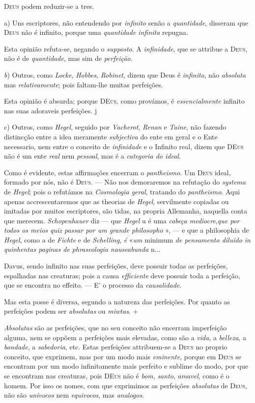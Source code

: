 \textsc{Deus} podem reduzir-se a tres.\par a) Uns escriptores, não entendendo por \emph{infinito} senão a \emph{quantidade}, disseram que \textsc{Deus} não é infinito, porque uma \emph{quantidade infinita} repugna.\par Esta opinião refuta-se, negando o \emph{supposto}. A \emph{infinidade}, que se attribue a \textsc{Deus}, não é de \emph{quantidade}, mas sim de \emph{perfeição}.\par \emph{b}) Outros, como \emph{Locke}, \emph{Hobbes}, \emph{Robinet}, dizem que Deus é \emph{infinito}, não \emph{absoluta} mas \emph{relativamente}; pois faltam-lhe muitas perfeições.\par Esta opinião é absurda; porque \textsc{DEus}, como provámos, é \emph{essencialmente} infinito nas suas adoraveis perfeições. j\par c) Outros, como \emph{Hegel}, seguido por \emph{Vacherot}, \emph{Renan} e \emph{Taine}, não fazendo \textbar{} distincção entre a idea meramente \emph{subjectiva} do ente em geral e o Ente necessario, nem entre o conceito de \emph{infinidade} e o Infinito real, dizem que \textsc{DEus} não é um ente \emph{real} nem \emph{pessoal}, mas é a \emph{categoria do ideal}.\par Como é evidente, estas affirmações encerram o \emph{pantheismo}. Um \textsc{Deus} ideal, formado por nós, não é \textsc{Deus}. --- Não nos demoraremos na refutação do \emph{systema} de \emph{Hegel}; pois o refutámos na \emph{Cosmologia geral}, tratando do \emph{pantheismo}. Aqui apenas accrescentaremos que as theorias de \emph{Hegel}, servilmente copiadas ou imitadas por muitos escriptores, são tidas, na propria Allemanha, naquella conta que merecem. \emph{Schopenhauer} diz --- que \emph{Hegel} u é uma \emph{cabeça mediocre},\emph{que por todos os meios quiz passar por um grande philosopho} », --- e que a philosophia de \emph{Hegel}, como a de \emph{Fichte} e de \emph{Schelling}, \emph{é} «\emph{um} minimum \emph{de pensamento diluido in quinhentas paginas de phraseologia nauseabunda} n...\par Davus, sendo infinito nas suas perfeições, deve possuir todas as perfeições, espalhadas nas creaturas; pois a causa \emph{efficiente} deve possuir toda a perfeição, que se encontra no effeito. --- E' o processo da \emph{causalidade}.\par Mas esta posse é diversa, segundo a natureza das perfeições. Por quanto as perfeições podem ser \emph{absolutas} ou \emph{miwtas}. +\par \emph{Absolutas} são as perfeições, que no seu conceito não encerram imperfeição alguma, nem se oppõem a perfeições mais elevadas, como são a \emph{vida}, a \emph{belleza}, a \emph{bondade}, a \emph{sabedoria}, etc. Estas perfeições attribuem-se a \textsc{Deus} no proprio conceito, que exprimem, mas por um modo mais \emph{eminente}, porque em \textsc{Deus} se encontram por um modo infinitamente mais perfeito e sublime do modo, por que se encontram nas creaturas, pois \textsc{DEus} não é \emph{bom}, \emph{santo}, \emph{amavel}, como é o homem. Por isso os nomes, com que exprimimos as perfeições \emph{absolutas} de \textsc{Deus}, não são \emph{univocos} nem \emph{equivocos}, mas \emph{analogos}. 